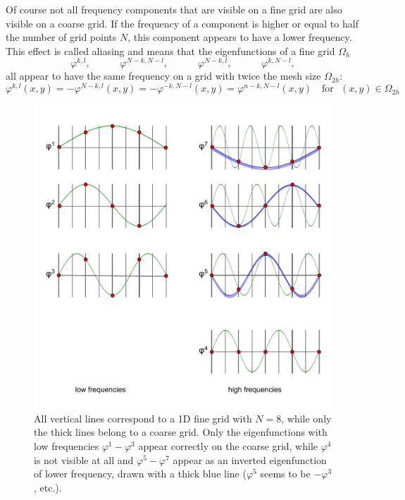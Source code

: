 Of course not all frequency components that are visible on a fine grid are also visible on a coarse grid. If the frequency of a component is higher or equal to half the number of grid points $N$, this component appears to have a lower frequency. 
This effect is called aliasing and means that the eigenfunctions of a fine grid $\Omega_h$
\begin{equation*}
\varphi^{k,l}, \text{~~~~~~~~~}\varphi^{N-k,N-l}, \text{~~~~~~~~~}\varphi^{N-k,l}, \text{~~~~~~~~~}\varphi^{k,N-l}, 
\end{equation*}
all appear to have the same frequency on a grid with twice the mesh size $\Omega_{2h}$:
\begin{equation}
\varphi^{k,l}(x,y) = - \varphi^{N-k,l}(x,y) = -\varphi^{-k,N-l}(x,y) = \varphi^{n-k,N-l}(x,y)  \text{~~~for~~}  (x,y) \in \Omega_{2h} 
\end{equation}


\begin{figure}[h]
	\centering
	\includegraphics[width=1.\textwidth]{chapters/chapter02/mg_low_aliasing}
	\caption{All vertical lines correspond to a 1D fine grid with $N = 8$, while only the thick lines belong to a coarse grid. Only the eigenfunctions with low frequencies $\varphi^1 - \varphi^3$ appear correctly on the coarse grid, while $\varphi^4$ is not visible at all and $\varphi^5 - \varphi^7$ appear as an inverted eigenfunction of lower frequency, drawn with a thick blue line ($\varphi^5$ seems to be $-\varphi^3$, etc.).}
	\label{fig:mg_aliasing}
\end{figure}


